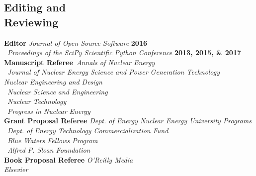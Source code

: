 \documentclass[margin,line]{resume}
\begin{document}
\begin{resume}
    \section{\mysidestyle Editing and\\Reviewing}
    \textbf{Editor} \hfill \emph{Journal of Open Source Software} \textbf{2016}\\%
                    \mbox{}~\hfill \emph{Proceedings of the SciPy Scientific Python Conference} \textbf{2013, 2015, \& 2017}\vspace{2mm}\\%
    \textbf{Manuscript Referee}~\hfill\emph{Annals of Nuclear Energy}\\%
                            \mbox{}~\hfill \emph{Journal of Nuclear Energy Science and Power Generation Technology} \\%
                            \mbox{}\hfill \emph{Nuclear Engineering and Design}\\%
                            \mbox{}~\hfill\emph{Nuclear Science and Engineering}\\%
                            \mbox{}~\hfill\emph{Nuclear Technology}\\%
                            \mbox{}~\hfill\emph{Progress in Nuclear Energy}\vspace{2mm}\\%
    \textbf{Grant Proposal Referee} \hfill \emph{Dept. of Energy Nuclear Energy University Programs}\\%
                            \mbox{}~\hfill\emph{Dept. of Energy Technology Commercialization Fund}\\%
                            \mbox{}~\hfill\emph{Blue Waters Fellows Program}\vspace{2mm}\\%
                            \mbox{}~\hfill\emph{Alfred P. Sloan Foundation}\vspace{2mm}\\%
    \textbf{Book Proposal Referee} \hfill\emph{O'Reilly Media}\\%
                            \mbox{}\hfill\emph{Elsevier}\vspace{2mm}\\%

\end{resume}
\end{document}
